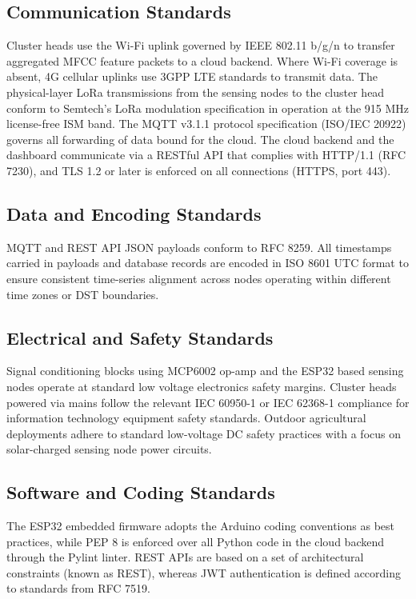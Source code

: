 \documentclass[12pt,a4paper,oneside]{memoir}
\begin{document}
\subsection{Communication Standards}

Cluster heads use the Wi-Fi uplink governed by IEEE 802.11 b/g/n to transfer aggregated MFCC feature packets to a cloud backend. Where Wi-Fi coverage is absent, 4G cellular uplinks use 3GPP LTE standards to transmit data. The physical-layer LoRa transmissions from the sensing nodes to the cluster head conform to Semtech's LoRa modulation specification in operation at the 915 MHz license-free ISM band. The MQTT v3.1.1 protocol specification (ISO/IEC 20922) governs all forwarding of data bound for the cloud. The cloud backend and the dashboard communicate via a RESTful API that complies with HTTP/1.1 (RFC 7230), and TLS 1.2 or later is enforced on all connections (HTTPS, port 443).


\subsection{Data and Encoding Standards}

MQTT and REST API JSON payloads conform to RFC 8259. All timestamps carried in payloads and database records are encoded in ISO 8601 UTC format to ensure consistent time-series alignment across nodes operating within different time zones or DST boundaries.

\subsection{Electrical and Safety Standards}

Signal conditioning blocks using MCP6002 op-amp and the ESP32 based sensing nodes operate at standard low voltage electronics safety margins. Cluster heads powered via mains follow the relevant IEC 60950-1 or IEC 62368-1 compliance for information technology equipment safety standards. Outdoor agricultural deployments adhere to standard low-voltage DC safety practices with a focus on solar-charged sensing node power circuits.

\subsection{Software and Coding Standards}

The ESP32 embedded firmware adopts the Arduino coding conventions as best practices, while PEP 8 is enforced over all Python code in the cloud backend through the Pylint linter. REST APIs are based on a set of architectural constraints (known as REST), whereas JWT authentication is defined according to standards from RFC 7519.
\end{document}
